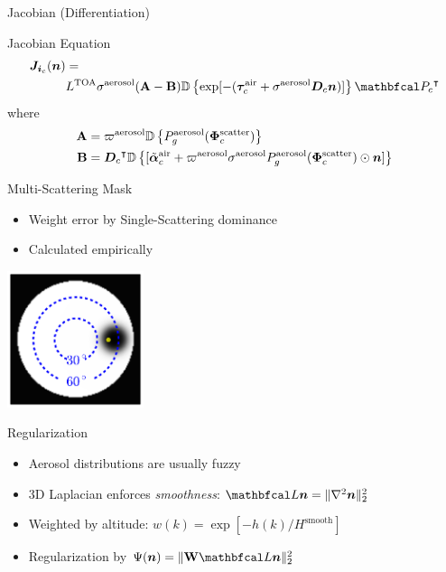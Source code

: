 \documentclass[compress,red,12pt]{beamer}
\begin{document}
\begin{frame}[label=jacobian]{Jacobian (Differentiation)}
  \begin{block}{Jacobian Equation}
    \begin{align*}
      {\bm J}_{{\bm i}_c}({\bm n}) &= \\
      &L^{\rm TOA}{\sigma}^{\rm
        aerosol}({\bf A}-{\bf B}) \OpDiag{\exp[-(\vect{\tau}_c^{\rm air} +
        {\sigma}^{\rm aerosol} {\bm D}_c {\bm n})]}
      \transpose{\OpCamera_c}
    \end{align*}
    where
    \begin{align*}
      {\bf A} &= \varpi^{\rm aerosol}
      \mathbb{D}\left\{ P_g^{\rm aerosol}(\bm{\Phi}^{\rm scatter}_c)\right\} \\
      {\bf B} &= {{\bm D}_c}^\intercal
      \mathbb{D}\left\{[\tilde{\bm{\alpha}}^{\rm air}_c + \varpi^{\rm
          aerosol}\sigma^{\rm aerosol} P^{\rm aerosol}_g(\bm{\Phi}^{\rm
          scatter}_c) \odot{\bm n}    ]\right\}
    \end{align*}
  \end{block}
  \hfill\hyperlink{gradient<2>}{}
\end{frame}


\begin{frame}[label=mask]{Multi-Scattering Mask}
  \begin{itemize}
  \item Weight error by Single-Scattering dominance
  \item Calculated empirically
  \end{itemize}
  \centerline{\includegraphics[height=4cm]{images/sun_mask.pdf}}
  \hfill\hyperlink{objective<6>}{} 
\end{frame}


\begin{frame}[label=regularization]{Regularization}
  \begin{itemize}
  \item Aerosol distributions are usually fuzzy
  \item 3D Laplacian enforces {\em smoothness}: $\Laplacian{\bm n} = \| \nabla^2{\bm  n}\|^2_2$
  \item Weighted by altitude: $w(k)=\exp\left[-h(k)/H^\mathrm{smooth}\right]$
  \item Regularization by $\Psi({\bm n}) = \| {\bf W} \Laplacian{\bm n}\|^2_2$
  \end{itemize}

  \hfill\hyperlink{objective<5>}{}
\end{frame}
\end{document}
